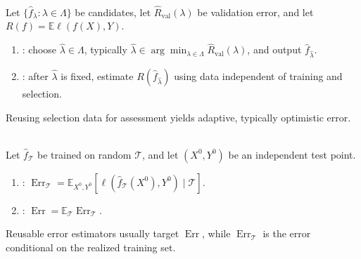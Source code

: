 \begin{definition} \label{def:sl-model-selection-versus-assessment} \\
Let $\{\widehat f_\lambda:\lambda\in\Lambda\}$ be candidates, let $\widehat R_{\mathrm{val}}(\lambda)$ be validation error, and let $R(f)=\mathbb{E}\ell(f(X),Y)$.
\begin{enumerate}[label=(\roman*)]
\setlength{\itemsep}{0pt}
\item {}: choose $\widehat\lambda\in\Lambda$, typically $\widehat\lambda\in\arg\min_{\lambda\in\Lambda}\widehat R_{\mathrm{val}}(\lambda)$, and output $\widehat f_{\widehat\lambda}$.
\item {}: after $\widehat\lambda$ is fixed, estimate $R(\widehat f_{\widehat\lambda})$ using data independent of training and selection.
\end{enumerate}
Reusing selection data for assessment yields adaptive, typically optimistic error.
\end{definition}

\begin{definition} \label{def:sl-conditional-expected-test-error} \\
Let $\widehat f_{\mathcal{T}}$ be trained on random $\mathcal{T}$, and let $(X^0,Y^0)$ be an independent test point.
\begin{enumerate}[label=(\roman*)]
\setlength{\itemsep}{0pt}
\item {}: $\operatorname{Err}_{\mathcal{T}}=\mathbb{E}_{X^0,Y^0}[\ell(\widehat f_{\mathcal{T}}(X^0),Y^0)\mid\mathcal{T}]$.
\item {}: $\operatorname{Err}=\mathbb{E}_{\mathcal{T}}\operatorname{Err}_{\mathcal{T}}$.
\end{enumerate}
Reusable error estimators usually target $\operatorname{Err}$, while $\operatorname{Err}_{\mathcal{T}}$ is the error conditional on the realized training set.
\end{definition}

